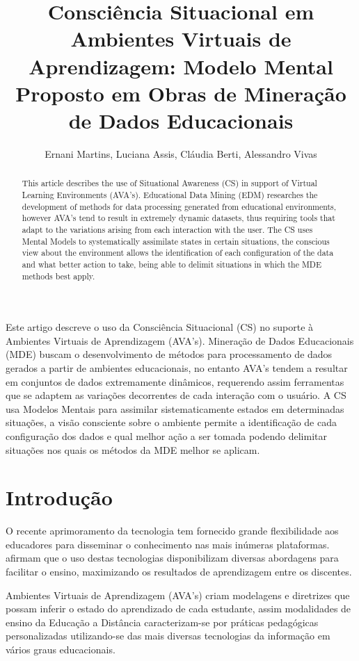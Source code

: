 \documentclass[12pt]{article}
\title{Consciência Situacional em Ambientes Virtuais de Aprendizagem:
	Modelo Mental Proposto em Obras de Mineração de Dados Educacionais }
\author{Ernani Martins\inst{1}, Luciana Assis\inst{2}, Cláudia Berti\inst{2}, Alessandro Vivas\inst{2} }
\begin{document}
 

\maketitle

\begin{abstract}
  This article describes the use of Situational Awareness (CS) in support of Virtual Learning Environments (AVA's). Educational Data Mining (EDM) researches the development of methods for data processing generated from educational environments, however AVA's tend to result in extremely dynamic datasets, thus requiring tools that adapt to the variations arising from each interaction with the user. The CS uses Mental Models to systematically assimilate states in certain situations, the conscious view about the environment allows the identification of each configuration of the data and what better action to take, being able to delimit situations in which the MDE methods best apply.
\end{abstract}
     
\begin{resumo} 
  Este artigo descreve o uso da Consciência Situacional (CS) no suporte à Ambientes Virtuais de Aprendizagem (AVA's). Mineração de Dados Educacionais (MDE) buscam o desenvolvimento de métodos para processamento de dados gerados a partir de ambientes educacionais, no entanto AVA's tendem a resultar em conjuntos de dados extremamente dinâmicos, requerendo assim ferramentas que se adaptem as variações decorrentes de cada interação com o usuário. A CS usa Modelos Mentais para assimilar sistematicamente estados em determinadas situações, a visão consciente sobre o ambiente permite a identificação de cada configuração dos dados e qual melhor ação a ser tomada podendo delimitar situações nos quais os métodos da MDE melhor se aplicam.
\end{resumo}


\section{Introdução} 

O recente aprimoramento da tecnologia tem fornecido grande flexibilidade aos educadores para disseminar o conhecimento nas mais inúmeras plataformas. \cite{Ahmad_Shamsuddin_2010} afirmam que o uso destas tecnologias disponibilizam diversas abordagens para facilitar o ensino, maximizando os resultados de aprendizagem entre os discentes.

Ambientes Virtuais de Aprendizagem (AVA's) criam modelagens e diretrizes que possam inferir o estado do aprendizado de cada estudante, assim modalidades de ensino da Educação a Distância caracterizam-se por práticas pedagógicas personalizadas utilizando-se das mais diversas tecnologias da informação em vários graus educacionais. 
\end{document}
